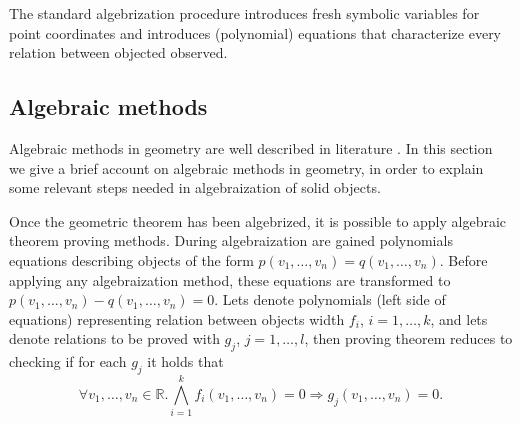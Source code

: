 \documentclass[final,1p,times,authoryear]{elsarticle}
\begin{document}
The standard algebrization procedure introduces fresh symbolic
variables for point coordinates and introduces (polynomial) equations
that characterize every relation between objected observed.

\begin{comment}
Each object can be given independently by adding its arbitrary
parameters or it can be given using relationship with other, already
introduced objects. In the second case, for each new object both the
parameters and the polynomials that represent relationship between new
object and other objects in the construction are
introduced. Polynomials contain parameters of all objects in the
construction rule and analytic identities. All polynomials are
recorded in construction set which is later used in GeoProver.

Beside construction rules, there are statement rules, rules used to
express some condition that can be check using GeoProver. For each of
these conditions are created polynomials which are recorded in the
statement set. Although in most of the cases, there is only one
statement polynomial, there were couple statement that generated more
than one. As mentioned earlier, GeoProver can only have one statement
rule. However, this not pose a problem, since for each polynomial in
the statement set GeoProver was applied (always using the same
construction set). The statement is considered to be true only if
GeoProver returned true for all polynomials in the statement set.

For the purpose of the further text we are going to assume that we
have all the necessary data for each construction or statement rule
(our system collects this data, but we are not going to explain
technical side of the system since we fill this is not the scope of
this paper). This means that we have all the parameters of already
given objects.
\end{comment}

\subsection{Algebraic methods}

Algebraic methods in geometry are well described in literature
\cite{wu, buchberger}. In this section we give a brief account on
algebraic methods in geometry, in order to explain some relevant steps
needed in algebraization of solid objects.


Once the geometric theorem has been algebrized, it is possible to
apply algebraic theorem proving methods. During algebraization are
gained polynomials equations describing objects of the form $p(v_1,
\ldots, v_n) = q(v_1, \ldots, v_n)$. Before applying any
algebraization method, these equations are transformed to $p(v_1,
\ldots, v_n) - q(v_1, \ldots, v_n) = 0$. Lets denote polynomials (left
side of equations) representing relation between objects width $f_i$,
$i = 1, \ldots, k$, and lets denote relations to be proved with $g_j$,
$j = 1, \ldots, l$, then proving theorem reduces to checking if for
each $g_j$ it holds that
$$\forall v_1, \ldots, v_n \in \mathbb{R}. \bigwedge_{i = 1}^{k} f_i(v_1, \ldots, v_n) = 0 \Longrightarrow g_j(v_1, \ldots, v_n) = 0.$$
\end{document}
